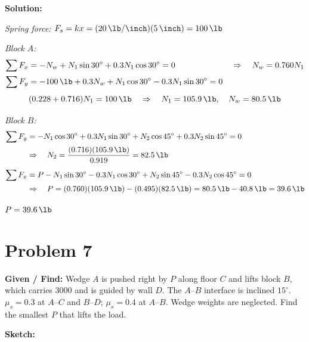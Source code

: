 \documentclass[11pt]{article}
\newcommand{\problem}[1]{\clearpage\section*{Problem #1}}
\begin{document}
\textbf{Solution:}

\textit{Spring force:} $F_s = kx = (\SI{20}{\lb/\inch})(\SI{5}{\inch}) = \SI{100}{\lb}$

\textit{Block $A$:}
\begin{align*}
    \sum F_x &= -N_w + N_1\sin 30^\circ + 0.3N_1\cos 30^\circ = 0 &&\Rightarrow\quad N_w = 0.760N_1 \\
    \sum F_y &= -\SI{100}{\lb} + 0.3N_w + N_1\cos 30^\circ - 0.3N_1\sin 30^\circ = 0
\end{align*}
\[
    (0.228 + 0.716)N_1 = \SI{100}{\lb} \quad\Rightarrow\quad N_1 = \SI{105.9}{\lb}, \quad N_w = \SI{80.5}{\lb}
\]

\textit{Block $B$:}
\begin{align*}
    \sum F_y &= -N_1\cos 30^\circ + 0.3N_1\sin 30^\circ + N_2\cos 45^\circ + 0.3N_2\sin 45^\circ = 0 \\
    &\Rightarrow\quad N_2 = \frac{(0.716)(\SI{105.9}{\lb})}{0.919} = \SI{82.5}{\lb} \\[4pt]
    \sum F_x &= P - N_1\sin 30^\circ - 0.3N_1\cos 30^\circ + N_2\sin 45^\circ - 0.3N_2\cos 45^\circ = 0 \\
    &\Rightarrow\quad P = (0.760)(\SI{105.9}{\lb}) - (0.495)(\SI{82.5}{\lb}) = \SI{80.5}{\lb} - \SI{40.8}{\lb} = \SI{39.6}{\lb}
\end{align*}
\begin{finalanswer}
    $P = \SI{39.6}{\lb}$
\end{finalanswer}

\problem{7}

\textbf{Given / Find:} Wedge $A$ is pushed right by $P$ along floor $C$ and lifts block $B$, which carries \SI{3000}{\lb} and is guided by wall $D$. The $A$--$B$ interface is inclined $15^\circ$. $\mu_s = 0.3$ at $A$--$C$ and $B$--$D$; $\mu_s = 0.4$ at $A$--$B$. Wedge weights are neglected. Find the smallest $P$ that lifts the load.

\textbf{Sketch:}
\end{document}
